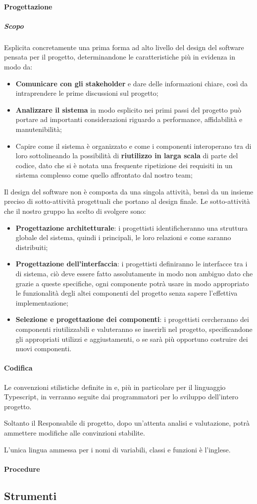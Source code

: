\paragraph{Progettazione}
\subparagraph{Scopo}\Spazio
Esplicita concretamente una prima forma ad alto livello del design del software pensata per il progetto, determinandone le caratteristiche più in evidenza in modo da:
	\begin{itemize}
	\item \textbf{{Comunicare con gli stakeholder}} e dare delle informazioni chiare, così da intraprendere le prime discussioni sul progetto;  	
	\item \textbf{{Analizzare il sistema}} in modo esplicito nei primi passi del progetto può portare ad importanti considerazioni riguardo a performance, affidabilità e manutenibilità;
	\item Capire come il sistema è organizzato e come i componenti interoperano tra di loro sottolineando la possibilità di \textbf{{riutilizzo in larga scala}} di parte del codice, dato che si è notata una frequente ripetizione dei requisiti in un sistema complesso come quello affrontato dal nostro team;  	
	\end{itemize} 	
Il design del software non è composta da una singola attività, bensì da un insieme preciso di sotto-attività progettuali che portano al design finale.
Le sotto-attività che il nostro gruppo ha scelto di svolgere sono:
	\begin{itemize}
	\item\textbf{{Progettazione architetturale}}: i progettisti identificheranno una struttura globale del sistema, quindi i  principali, le loro relazioni e come saranno distribuiti;  	
	\item\textbf{{Progettazione dell'interfaccia}}: i progettisti definiranno le interfacce tra i  di sistema, ciò deve essere fatto assolutamente in modo non ambiguo dato che grazie a queste specifiche, ogni componente potrà usare in modo appropriato le funzionalità degli altei componenti del progetto senza sapere l'effettiva implementazione;  	
	\item\textbf{{Selezione e progettazione dei componenti}}: i progettisti cercheranno dei componenti riutilizzabili e valuteranno se inserirli nel progetto, specificandone gli appropriati utilizzi e aggiustamenti, o se sarà più opportuno costruire dei nuovi componenti.  	
\end{itemize} 	
\paragraph{Codifica}\Spazio
Le convenzioni stilistiche definite in  e, più in particolare per il linguaggio Typescript, in  verranno seguite dai programmatori per lo sviluppo dell'intero progetto.

Soltanto il Responsabile di progetto, dopo un'attenta analisi e valutazione, potrà ammettere modifiche alle convinzioni stabilite.

L’unica lingua ammessa per i nomi di variabili, classi e funzioni è l’inglese. 
\paragraph{Procedure}
\subsection{Strumenti}
\pagebreak